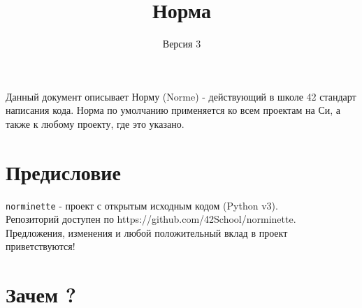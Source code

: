 \documentclass{42-ru}
\begin{document}
\title{Норма}
\subtitle{Версия 3}

\summary
{
    Данный документ описывает Норму (Norme) - действующий в школе 42 стандарт написания кода.
    Норма по умолчанию применяется ко всем проектам на Си, а также к любому проекту, где это указано.
}

\maketitle

\tableofcontents


\chapter{Предисловие}

    \texttt{norminette} - проект с открытым исходным кодом (Python v3). \\
    Репозиторий доступен по https://github.com/42School/norminette. \\
    Предложения, изменения и любой положительный вклад в проект приветствуются!

    \newpage


\chapter{Зачем ?}
\end{document}

